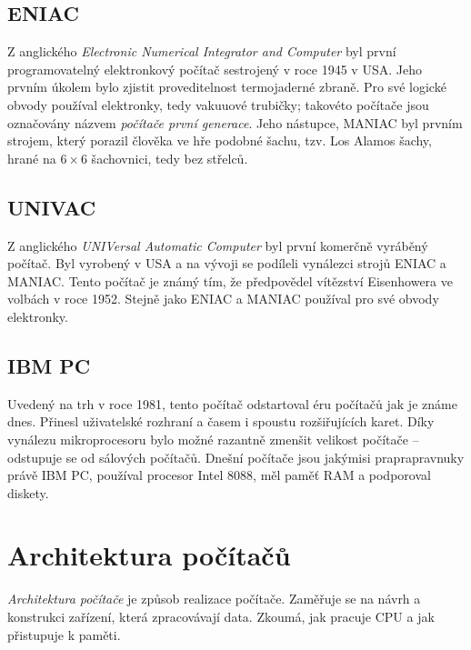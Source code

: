 \documentclass[a4paper]{article}
\begin{document}
    \subsection{ENIAC}
        Z anglického \textit{Electronic Numerical Integrator and Computer} byl první programovatelný elektronkový počítač sestrojený v roce 1945 v USA. Jeho prvním úkolem bylo zjistit proveditelnost termojaderné zbraně. Pro své logické obvody používal elektronky, tedy vakuuové trubičky; takovéto počítače jsou označovány názvem \textit{počítače první generace}. Jeho nástupce, MANIAC byl prvním strojem, který porazil člověka ve hře podobné šachu, tzv. Los Alamos šachy, hrané na $6 \times 6$ šachovnici, tedy bez střelců.
    \subsection{UNIVAC}
        Z anglického \textit{UNIVersal Automatic Computer} byl první komerčně vyráběný počítač. Byl vyrobený v USA a na vývoji se podíleli vynálezci strojů ENIAC a MANIAC. Tento počítač je známý tím, že předpovědel vítězství Eisenhowera ve volbách v roce 1952. Stejně jako ENIAC a MANIAC používal pro své obvody elektronky.
    \subsection{IBM PC}
        Uvedený na trh v roce 1981, tento počítač odstartoval éru počítačů jak je známe dnes. Přinesl uživatelské rozhraní a časem i spoustu rozšiřujících karet. Díky vynálezu mikroprocesoru bylo možné razantně zmenšit velikost počítače -- odstupuje se od sálových počítačů. Dnešní počítače jsou jakýmisi praprapravnuky právě IBM PC, používal procesor Intel 8088, měl paměť RAM a podporoval diskety.

\newpage


\section{Architektura počítačů}
    \textit{Architektura počítače} je způsob realizace počítače. Zaměřuje se na návrh a konstrukci zařízení, která zpracovávají data. Zkoumá, jak pracuje CPU a jak přistupuje k paměti.
\end{document}
